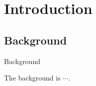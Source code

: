 \section{Introduction}\label{sec:introduction}

\subsection{Background}\label{subsec:background}

\begin{frame}{Background}

    The background is $\cdots$.

\end{frame}
